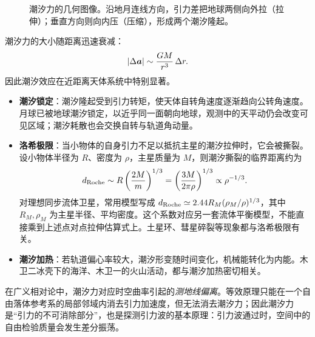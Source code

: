\begin{figure}[htbp]
\centering
{}
\caption{潮汐力的几何图像。沿地月连线方向，引力差把地球两侧向外拉（拉伸）；垂直方向则向内压（压缩），形成两个潮汐隆起。}
\label{fig:tidal}
\end{figure}

潮汐力的大小随距离迅速衰减：
\begin{equation}
|\Delta\boldsymbol{a}|\sim\frac{GM}{r^3}\,\Delta r .
\end{equation}
因此潮汐效应在近距离天体系统中特别显著。

\begin{itemize}[leftmargin=2.2em]
  \item \textbf{潮汐锁定}：潮汐隆起受到引力转矩，使天体自转角速度逐渐趋向公转角速度。月球已被地球潮汐锁定，以近乎同一面朝向地球，观测中的天平动仍会改变可见区域；潮汐耗散也会交换自转与轨道角动量。
  \item \textbf{洛希极限}：当小物体的自身引力不足以抵抗主星的潮汐拉伸时，它会被撕裂。设小物体半径为 $R$、密度为 $\rho$，主星质量为 $M$，则潮汐撕裂的临界距离约为
  \begin{equation}
  d_{\rm Roche}\sim R\left(\frac{2M}{m}\right)^{1/3}
  =\left(\frac{3M}{2\pi\rho}\right)^{1/3}
  \propto \rho^{-1/3}.
  \end{equation}
  对理想同步流体卫星，常用模型写成 $d_{\rm Roche}\simeq2.44R_M(\rho_M/\rho)^{1/3}$，其中 $R_M,\rho_M$ 为主星半径、平均密度。这个系数对应另一套流体平衡模型，不能直接乘到上述点对点拉伸估算式上。土星环、彗星碎裂等现象都与洛希极限有关。
  \item \textbf{潮汐加热}：若轨道偏心率较大，潮汐形变随时间变化，机械能转化为内能。木卫二冰壳下的海洋、木卫一的火山活动，都与潮汐加热密切相关。
\end{itemize}

\begin{modernbox}
在广义相对论中，潮汐力对应时空曲率引起的\emph{测地线偏离}。等效原理只能在一个自由落体参考系的局部邻域内消去引力加速度，但无法消去潮汐力；因此潮汐力是“引力的不可消除部分”，也是探测引力波的基本原理：引力波通过时，空间中的自由检验质量会发生差分振荡。
\end{modernbox}


